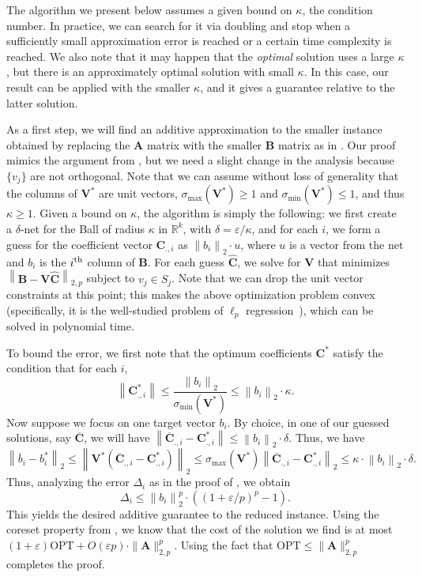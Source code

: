 \documentclass[11pt]{article}
\makeatletter
\newcommand{\norm}[1]{\left\lVert#1\right\rVert}
\theoremstyle{plain}
\theoremstyle{plain}
\theoremstyle{definition}
\theoremstyle{plain}
\theoremstyle{remark}
\newenvironment{proof}[1][\protect\proofname]{\par
	\normalfont\topsep6\p@\@plus6\p@\relax
	\trivlist
	\itemindent\parindent
	\item[\hskip\labelsep\scshape #1]\ignorespaces
}{\endtrivlist\@endpefalse
}
\providecommand{\proofname}{Proof}
\newcommand{\RR}{\mathbb{R}}
\newcommand{\eps}{\varepsilon}
\newcommand{\opt}{\ensuremath{\text{OPT}}\xspace}
\makeatother
\begin{document}
The algorithm we present below assumes a given bound on $\kappa$, the condition number. In practice, we can search for it via doubling and stop when a sufficiently small approximation error is reached or a certain time complexity is reached. We also note that it may happen that the \emph{optimal} solution uses a large $\kappa$, but there is an approximately optimal solution with small $\kappa$. In this case, our result can be applied with the smaller $\kappa$, and it gives a guarantee relative to the latter solution.

\begin{proof}
As a first step, we will find an additive approximation to the smaller instance obtained by replacing the $\bm{A}$ matrix with the smaller $\bm{B}$ matrix as in . Our proof mimics the argument from , but we need a slight change in the analysis because $\{v_j\}$ are not orthogonal. Note that we can assume without loss of generality that the columns of $\bm{V}^*$ are unit vectors, $\sigma_{\max} (\bm{V}^*) \ge 1$ and $\sigma_{\min} (\bm{V}^*) \le 1$, and thus $\kappa \ge 1$. Given a bound on $\kappa$, the algorithm is simply the following: we first create a $\delta$-net for the Ball of radius $\kappa$ in $\RR^{k}$, with $\delta = \eps / \kappa$, and for each $i$, we form a guess for the coefficient vector $\bm{C}_{.,i}$ as $\norm{b_i}_2 \cdot u$, where $u$ is a vector from the net and $b_i$ is the $i^{\textnormal{th}}$ column of $\bm{B}$. For each guess $\widehat{\bm{C}}$, we solve for $\bm{V}$ that minimizes $\norm{\bm{B} - \bm{V} \widehat{\bm{C}}}_{2,p}$ subject to $v_j \in S_j$. Note that we can drop the unit vector constraints at this point; this makes the above optimization problem convex (specifically, it is the well-studied problem of $\ell_p$ regression~\cite{adil2024}), which can be solved in polynomial time.

To bound the error, we first note that the optimum coefficients $\bm{C}^*$ satisfy the condition that for each $i$, 
\[ \norm{\bm{C}^*_{., i}} \le \frac{\norm{b_i}_2}{\sigma_{\min}(\bm{V}^*)} \le \norm{b_i}_2 \cdot \kappa . \]
Now suppose we focus on one target vector $b_i$. By choice, in one of our guessed solutions, say $\overline{\bm{C}}$, we will have $\norm{\overline{\bm{C}}_{., i} - \bm{C}^*_{., i}} \le \norm{b_i}_2 \cdot \delta$. Thus, we have
\[  \norm{\overline{b}_i - b_i^*}_2 \le \norm{\bm{V}^* (\overline{\bm{C}}_{., i} - \bm{C}^*_{., i}) }_2 \le \sigma_{\max} (\bm{V}^*) \norm{\overline{\bm{C}}_{., i} - \bm{C}^*_{., i}}_2 \le \kappa \cdot \norm{b_i}_2 \cdot \delta. \]
Thus, analyzing the error $\Delta_i$ as in the proof of , we obtain
\[ \Delta_i \le \norm{b_i}_2^p \cdot \left( (1+\varepsilon/p)^p -1 \right).  \]
This yields the desired additive guarantee to the reduced instance. Using the coreset property from , we know that the cost of the solution we find is at most $(1+\varepsilon)\opt+O(\varepsilon p)\cdot \|\bm{A}\|_{2,p}^p$. Using the fact that $\opt \leq \|\bm{A}\|_{2,p}^p$ completes the proof. 
\end{proof}
\end{document}
